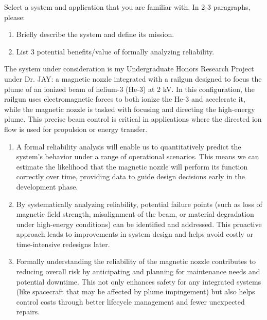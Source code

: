 \begin{hwkProblem}{1}{}

	Select a system and application that you are familiar with. In 2-3 paragraphs, please:
	\begin{enumerate}
		\item Briefly describe the system and define its mission.
		\item List 3 potential benefits/value of formally analyzing reliability.
	\end{enumerate}

	\hwkSol

	\hwkPart

	The system under consideration is my Undergraduate Honors Research Project under Dr. JAY: a magnetic nozzle integrated with a railgun designed to focus the plume of an ionized beam of helium-3 (He-3) at 2 kV. In this configuration, the railgun uses electromagnetic forces to both ionize the He-3 and accelerate it, while the magnetic nozzle is tasked with focusing and directing the high-energy plume. This precise beam control is critical in applications where the directed ion flow is used for propulsion or energy transfer.

	\hwkPart

	\begin{enumerate}
		\item A formal reliability analysis will enable us to quantitatively predict the system’s behavior under a range of operational scenarios. This means we can estimate the likelihood that the magnetic nozzle will perform its function correctly over time, providing data to guide design decisions early in the development phase.
		\item By systematically analyzing reliability, potential failure points (such as loss of magnetic field strength, misalignment of the beam, or material degradation under high-energy conditions) can be identified and addressed. This proactive approach leads to improvements in system design and helps avoid costly or time-intensive redesigns later.
		\item Formally understanding the reliability of the magnetic nozzle contributes to reducing overall risk by anticipating and planning for maintenance needs and potential downtime. This not only enhances safety for any integrated systems (like spacecraft that may be affected by plume impingement) but also helps control costs through better lifecycle management and fewer unexpected repairs.
	\end{enumerate}

\end{hwkProblem}

